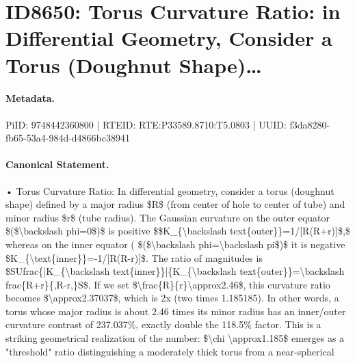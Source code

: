\section*{ID8650: Torus Curvature Ratio: in Differential Geometry, Consider a Torus (Doughnut Shape)…}
\paragraph{Metadata.}
PiID: 9748442360800 | RTEID: RTE:P33589.8710:T5.0803 | UUID: f3da8280-fb65-53a4-984d-d4866bc38941

\paragraph{Canonical Statement.}
• Torus Curvature Ratio: In differential geometry, consider a torus (doughnut shape) defined by a major radius \$R\$ (from center of hole to center of tube) and minor radius \$r\$ (tube radius). The Gaussian curvature on the outer equator \$(\$\textbackslash{}backslash phi=0\$)\$ is positive \$\$K\_\{\textbackslash{}backslash text\{outer\}\}=1/[R(R+r)]\$,\$ whereas on the inner equator ( \$(\$\textbackslash{}backslash phi=\textbackslash{}backslash pi\$)\$ it is negative \$K\_\{\textbackslash{}text\{inner\}\}=-1/[R(R-r)]\$. The ratio of magnitudes is \$SUfrac\{|K\_\{\textbackslash{}backslash text\{inner\}\}|\{K\_\{\textbackslash{}backslash text\{outer\}\}=\textbackslash{}backslash frac\{R+r\}\{,R-r,\}S\$. If we set \$\textbackslash{}frac\{R\}\{r\}\textbackslash{}approx2.46\$, this curvature ratio becomes \$\textbackslash{}approx2.37037\$, which is 2x (two times 1.185185). In other words, a torus whose major radius is about 2.46 times its minor radius has an inner/outer curvature contrast of 237.037\%, exactly double the 118.5\% factor. This is a striking geometrical realization of the number: \$\textbackslash{}chi \textbackslash{}approx1.185\$ emerges as a "threshold" ratio distinguishing a moderately thick torus from a near-spherical

